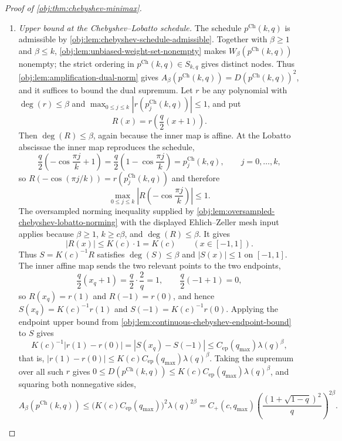 \documentclass[11pt]{article}
\begin{document}
\begin{proof}[Proof of \cref{obj:thm:chebyshev-minimax}]
\begin{enumerate}
\item \emph{Upper bound at the Chebyshev--Lobatto schedule.}
The schedule \(p^{\mathrm{Ch}}(k,q)\) is admissible by \cref{obj:lem:chebyshev-schedule-admissible}. Together with \(\beta\ge1\) and \(\beta\le k\), \cref{obj:lem:unbiased-weight-set-nonempty} makes \(W_\beta(p^{\mathrm{Ch}}(k,q))\) nonempty; the strict ordering in \(p^{\mathrm{Ch}}(k,q)\in S_{k,q}\) gives distinct nodes. Thus \cref{obj:lem:amplification-dual-norm} gives
\(A_\beta(p^{\mathrm{Ch}}(k,q))=D(p^{\mathrm{Ch}}(k,q))^2\), and it suffices to bound the dual supremum. Let \(r\) be
any polynomial with \(\deg(r)\le\beta\) and
\(\max_{0\le j\le k} |r(p^{\mathrm{Ch}}_j(k,q))|\le1\), and put
\[
R(x)=r\!\left(\frac q2(x+1)\right).
\]
Then \(\deg(R)\le\beta\), again because the inner map is affine. %
At the Lobatto abscissae the inner map reproduces the schedule,
\[
\frac q2\left(-\cos\frac{\pi j}{k}+1\right)
=
\frac q2\left(1-\cos\frac{\pi j}{k}\right)
=
p^{\mathrm{Ch}}_j(k,q),
\qquad j=0,\ldots,k,
\]
so \(R(-\cos(\pi j/k))=r(p^{\mathrm{Ch}}_j(k,q))\) and therefore
\[
\max_{0\le j\le k}\left|R\!\left(-\cos\frac{\pi j}{k}\right)\right|\le1 .
\]
The oversampled norming inequality supplied by \cref{obj:lem:oversampled-chebyshev-lobatto-norming} with the displayed Ehlich--Zeller mesh input applies because \(\beta\ge1\), \(k\ge c\beta\), and \(\deg(R)\le\beta\). It gives
\[
|R(x)|\le K(c)\cdot 1=K(c)\qquad (x\in[-1,1]).
\]
Thus \(S=K(c)^{-1}R\) satisfies \(\deg(S)\le\beta\) and \(|S(x)|\le1\) on \([-1,1]\). The inner affine map sends the two relevant points to the two endpoints,
\[
\frac q2\left(x_q+1\right)=\frac q2\cdot\frac2q=1,
\qquad
\frac q2\left(-1+1\right)=0,
\]
so \(R(x_q)=r(1)\) and \(R(-1)=r(0)\), and hence \(S(x_q)=K(c)^{-1}r(1)\) and \(S(-1)=K(c)^{-1}r(0)\). Applying the endpoint upper bound from
\cref{obj:lem:continuous-chebyshev-endpoint-bound} to \(S\) gives
\[
K(c)^{-1}|r(1)-r(0)|
=
|S(x_q)-S(-1)|
\le C_{\mathrm{ep}}(q_{\max})\lambda(q)^\beta,
\]
that is, \(|r(1)-r(0)|\le K(c)C_{\mathrm{ep}}(q_{\max})\lambda(q)^\beta\). Taking the supremum over all such \(r\) gives
\(0\le D(p^{\mathrm{Ch}}(k,q))\le K(c)C_{\mathrm{ep}}(q_{\max})\lambda(q)^\beta\), and squaring both nonnegative sides,
\[
A_\beta\!\left(p^{\mathrm{Ch}}(k,q)\right)
\le
\bigl(K(c)C_{\mathrm{ep}}(q_{\max})\bigr)^2\lambda(q)^{2\beta}
=
C_+(c,q_{\max})
\left(\frac{(1+\sqrt{1-q})^2}{q}\right)^{2\beta}.
\]


\end{enumerate}
\end{proof}
\end{document}
